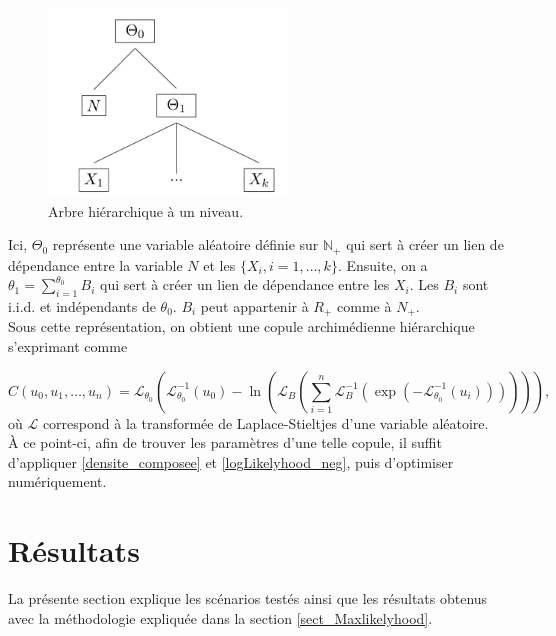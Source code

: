 \documentclass{article}
\begin{document}
	\begin{figure}[H]
		\centering
		\includegraphics[height=5cm]{Hierarchie}
		\renewcommand{\figurename}{Illustration}
		\caption{Arbre hiérarchique à un niveau.} \label{graph_hierarchie}
	\end{figure}

	Ici, $\Theta_0$ représente une variable aléatoire définie sur $\mathbb{N}_+$ qui sert à créer un lien de dépendance entre la variable $N$ et les $\{X_i, i=1,\dots , k\}$. Ensuite, on a $\theta_1 = \sum_{i=1}^{\theta_0} B_i$ qui sert à créer un lien de dépendance entre les $X_i$. Les $B_i$ sont i.i.d. et indépendants de $\theta_0$. $B_i$ peut appartenir à $R_+$ comme à $N_+$. \\
	
	Sous cette représentation, on obtient une copule archimédienne hiérarchique s'exprimant comme
	
	\begin{equation}
	C(u_0, u_1, \dots, u_n) =
		\mathscr{L}_{\theta_0} \left(
			\mathscr{L}_{\theta_0}^{-1}(u_0) - \ln \left( 
				\mathscr{L}_B  \left(
					\sum_{i=1}^{n} \mathscr{L}_{B}^{-1} \left(
					 \exp \left(
					  - \mathscr{L}_{\theta_0}^{-1}(u_i) 
					  \right) \right)\right)\right)\right),
	\end{equation}
	où $\mathscr{L}$ correspond à la transformée de Laplace-Stieltjes d'une variable aléatoire.\\
	
	À ce point-ci, afin de trouver les paramètres d'une telle copule, il suffit d'appliquer \eqref{densite_composee} et \eqref{logLikelyhood_neg}, puis d'optimiser numériquement.
	
	\section{Résultats}
	La présente section explique les scénarios testés ainsi que les résultats obtenus avec la méthodologie expliquée dans la section \ref{sect_Maxlikelyhood}.\\
	
\end{document}
